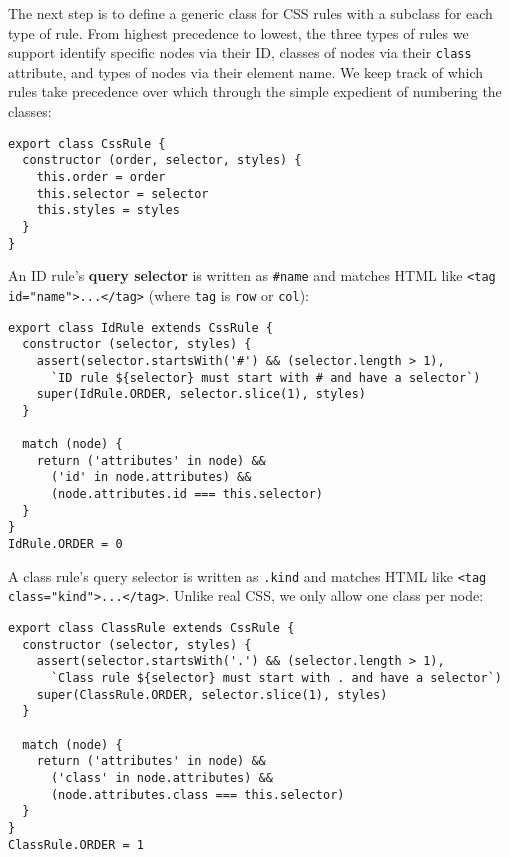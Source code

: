 \documentclass[krantzl]{krantz}
\newcommand{\glossref}[1]{\textbf{#1}}
\begin{document}
The next step is to define a generic class for CSS rules
with a subclass for each type of rule.
From highest precedence to lowest,
the three types of rules we support identify specific nodes via their ID,
classes of nodes via their \texttt{class} attribute,
and types of nodes via their element name.
We keep track of which rules take precedence over which through the simple expedient of numbering the classes:


\begin{lstlisting}[frame=single,frameround=tttt]
export class CssRule {
  constructor (order, selector, styles) {
    this.order = order
    this.selector = selector
    this.styles = styles
  }
}
\end{lstlisting}



An ID rule's \glossref{query selector} is written as \texttt{\#name}
and matches HTML like \texttt{<tag id="name">...</tag>} (where \texttt{tag} is \texttt{row} or \texttt{col}):


\begin{lstlisting}[frame=single,frameround=tttt]
export class IdRule extends CssRule {
  constructor (selector, styles) {
    assert(selector.startsWith('#') && (selector.length > 1),
      `ID rule ${selector} must start with # and have a selector`)
    super(IdRule.ORDER, selector.slice(1), styles)
  }

  match (node) {
    return ('attributes' in node) &&
      ('id' in node.attributes) &&
      (node.attributes.id === this.selector)
  }
}
IdRule.ORDER = 0
\end{lstlisting}



A class rule's query selector is written as \texttt{.kind} and matches HTML like \texttt{<tag class="kind">...</tag>}.
Unlike real CSS,
we only allow one class per node:


\begin{lstlisting}[frame=single,frameround=tttt]
export class ClassRule extends CssRule {
  constructor (selector, styles) {
    assert(selector.startsWith('.') && (selector.length > 1),
      `Class rule ${selector} must start with . and have a selector`)
    super(ClassRule.ORDER, selector.slice(1), styles)
  }

  match (node) {
    return ('attributes' in node) &&
      ('class' in node.attributes) &&
      (node.attributes.class === this.selector)
  }
}
ClassRule.ORDER = 1
\end{lstlisting}
\end{document}
